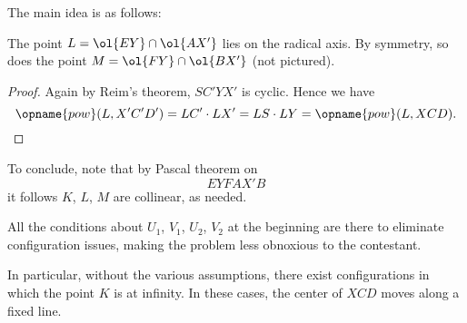 The main idea is as follows:
\begin{claim*}
  The point $L = \ol{EY} \cap \ol{AX'}$ lies on the radical axis.
  By symmetry, so does the point $M = \ol{FY} \cap \ol{BX'}$ (not pictured).
\end{claim*}
\begin{proof}
  Again by Reim's theorem, $SC'YX'$ is cyclic.
  Hence we have
  \[ \opname{pow}(L, X'C'D') = LC' \cdot LX'
    = LS \cdot LY = \opname{pow}(L, XCD). \qedhere \]
\end{proof}

To conclude, note that by Pascal theorem on
\[ EYFAX'B \]
it follows $K$, $L$, $M$ are collinear,
as needed.

\begin{remark*}
  All the conditions about $U_1$, $V_1$, $U_2$, $V_2$
  at the beginning are there to eliminate configuration issues,
  making the problem less obnoxious to the contestant.

  In particular, without the various assumptions,
  there exist configurations in which the point $K$ is at infinity.
  In these cases, the center of $XCD$ moves along a fixed line.
\end{remark*}

